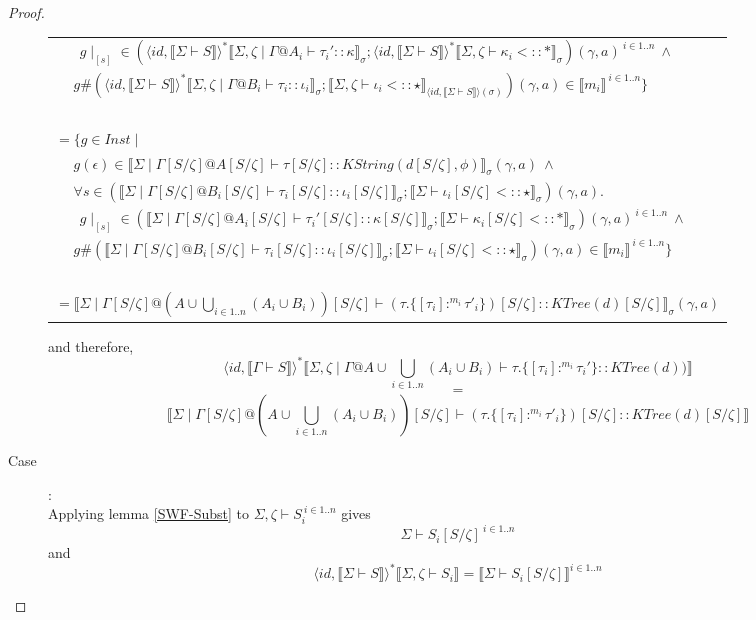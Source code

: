 \documentclass{article}
\newcommand{\sem}[1]{\llbracket #1 \rrbracket}
\begin{document}
\begin{proof}
\begin{description}
\begin{center}
\begin{tabular}{l}
$~~~~~~~~g \! \mid_{[s]} \in (\langle \mathit{id}, \sem{\Sigma \vdash S} \rangle^* \sem{\Sigma,\zeta \mid \Gamma @ A_i \vdash \tau_i' :: \kappa}_{\sigma};\langle \mathit{id}, \sem{\Sigma \vdash S} \rangle^* \sem{\Sigma,\zeta \vdash \kappa_i <:: \ast}_{\sigma})(\gamma,a)^{~i \in 1..n}~\wedge$\\
$~~~~~~g \# (\langle \mathit{id}, \sem{\Sigma \vdash S} \rangle^* \sem{\Sigma,\zeta \mid \Gamma @ B_i \vdash \tau_i :: \iota_i}_{\sigma};\sem{\Sigma,\zeta \vdash \iota_i <:: \star}_{\langle \mathit{id}, \sem{\Sigma \vdash S} \rangle(\sigma)})(\gamma,a) \in \sem{m_i}^{~i \in 1..n} \}$ \\~\\
$= \{ g \in \mathit{Inst} \mid$ \\
$~~~~~~g(\epsilon) \in \sem{\Sigma \mid \Gamma[S/\zeta] @ A[S/\zeta] \vdash \tau[S/\zeta] :: \mathit{KString(d[S/\zeta],\phi)}}_{\sigma}(\gamma,a)~\wedge$ \\
$~~~~~~\forall s \in (\sem{\Sigma \mid \Gamma[S/\zeta] @ B_i[S/\zeta] \vdash \tau_i[S/\zeta] :: \iota_i[S/\zeta]}_{\sigma};\sem{\Sigma \vdash \iota_i[S/\zeta] <:: \star}_{\sigma})(\gamma,a).$\\
$~~~~~~~~g \! \mid_{[s]} \in (\sem{\Sigma \mid \Gamma[S/\zeta] @ A_i[S/\zeta] \vdash \tau_i'[S/\zeta] :: \kappa[S/\zeta]}_{\sigma};\sem{\Sigma \vdash \kappa_i[S/\zeta] <:: \ast}_{\sigma})(\gamma,a)^{~i \in 1..n}~\wedge$\\
$~~~~~~g \# (\sem{\Sigma \mid \Gamma[S/\zeta] @ B_i[S/\zeta] \vdash \tau_i[S/\zeta] :: \iota_i[S/\zeta]}_{\sigma};\sem{\Sigma \vdash \iota_i[S/\zeta] <:: \star}_{\sigma})(\gamma,a) \in \sem{m_i}^{~i \in 1..n} \}$\\~\\
$= \sem{\Sigma \mid \Gamma[S/\zeta] @ (A \cup \bigcup_{i \in 1..n} (A_i \cup B_i))[S/\zeta] \vdash (\tau.\{ [\tau_i] :^{m_i} \tau'_i \})[S/\zeta] :: \mathit{KTree}(d)[S/\zeta]  }_{\sigma}(\gamma,a)  $
\end{tabular}
\end{center}
and therefore,
$$\langle \mathit{id}, \sem{\Gamma \vdash S} \rangle^* \sem{\Sigma,\zeta \mid \Gamma @ A \cup \bigcup_{i \in 1..n} (A_i \cup B_i) \vdash \tau.\{ [\tau_i] :^{m_i} \tau_i' \} :: \mathit{KTree}(d))}$$ $$=$$ $$\sem{\Sigma \mid \Gamma[S/\zeta] @ (A \cup \bigcup_{i \in 1..n} (A_i \cup B_i))[S/\zeta] \vdash (\tau.\{ [\tau_i] :^{m_i} \tau'_i \})[S/\zeta] :: \mathit{KTree}(d)[S/\zeta]}$$
\item[Case \sc{Path}]:~\\
Applying lemma \ref{SWF-Subst} to $\Sigma,\zeta \vdash S_i^{~i \in 1..n}$ gives $$\Sigma \vdash S_i[S/\zeta]^{~i \in 1..n}$$ and $$\langle \mathit{id}, \sem{\Sigma \vdash S} \rangle^* \sem{\Sigma, \zeta \vdash S_i} = \sem{\Sigma \vdash S_i[S/\zeta]}^{i \in 1..n}$$ 

\end{description}
\end{proof}
\end{document}
